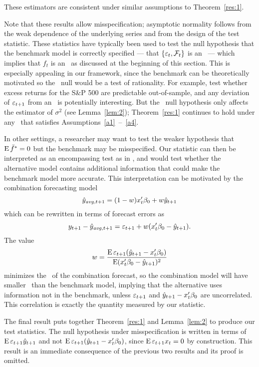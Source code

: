 \documentclass[12pt,fleqn]{article}
\providecommand\phantomsection{}
\begin{document}
These estimators are consistent under similar assumptions to
Theorem~\ref{res:1}.

\phantomsection
{}
\begin{lem}\label{lem:2}\end{lem}

Note that these results allow misspecification; asymptotic normality
follows from the weak dependence of the underlying series and from the
design of the test statistic. These statistics have typically been
used to test the null hypothesis that the benchmark model is correctly
specified --- that $\{\varepsilon_t, \mathcal{F}_t\}$ is an \mds\ --- which
implies that $f_t$ is an \mds\ as discussed
at the beginning of this section. This is especially appealing in our
framework, since the benchmark can be theoretically motivated so the
\mds\ null would be a test of rationality. For example, \citet{GoW:08}
test whether excess returns for the S\&P 500 are predictable
out-of-sample, and any deviation of $\varepsilon_{t+1}$ from an \mds\ is potentially
interesting. But the \mds\ null hypothesis only affects the estimator
of $\sigma^2$ (see Lemma~\ref{lem:2}); Theorem~\ref{res:1} continues
to hold under any \dgp\ that satisfies Assumptions~\ref{a1}~--~\ref{a4}.

In other settings, a researcher may want to test the weaker hypothesis
that $\operatorname{E} \bar{f}^* = 0$ but the benchmark may be misspecified. Our
statistic can then be interpreted as an encompassing test as in
\citet{HLN:98}, and would test whether the alternative model contains
additional information that could make the benchmark model more
accurate. This interpretation can be motivated by the combination forecasting
model
\begin{equation*}
  \yh_{\mathit{avg},t+1} = (1 - w) x_t'\btrue + w \yh_{t+1}
\end{equation*}
which can be rewritten in terms of forecast errors as
\[
y_{t+1} - \yh_{\mathit{avg},t+1} = \ep_{t+1} + w (x_t'\btrue - \yh_{t+1}).
\]
The value
\[
w = \frac{\E \ep_{t+1} (\yh_{t+1} - x_t'\btrue)}{\E (x_t'\btrue - \yh_{t+1})^2}
\]
minimizes the \mse\ of the combination forecast, so the combination
model will have smaller \mse\ than the benchmark model, implying that
the alternative uses information not in the benchmark, unless
$\varepsilon_{t+1}$ and $\yh_{t+1} - x_t'\btrue$ are uncorrelated. This
correlation is exactly the quantity measured by our statistic.

The final result puts together Theorem~\ref{res:1} and
Lemma~\ref{lem:2} to produce our test statistics. The null hypothesis
under misspecification is written in terms of $\operatorname{E} \varepsilon_{t+1} \hat{y}_{t+1}$
and not $\E \ep_{t+1} (\yh_{t+1} - x_t'\btrue)$, since $\operatorname{E} \varepsilon_{t+1}
x_t = 0$ by construction. This result is an immediate consequence of
the previous two results and its proof is omitted.
\end{document}
